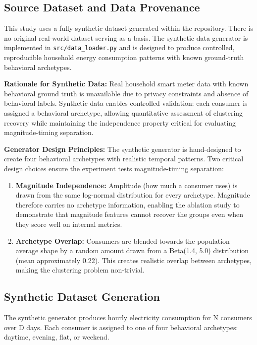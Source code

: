 \documentclass[11pt,a4paper]{article}
\begin{document}
\subsection{Source Dataset and Data Provenance}
\label{sec:provenance}

This study uses a fully synthetic dataset generated within the repository. There is no original real-world dataset serving as a basis. The synthetic data generator is implemented in \texttt{src/data\_loader.py} and is designed to produce controlled, reproducible household energy consumption patterns with known ground-truth behavioral archetypes.

\textbf{Rationale for Synthetic Data:} Real household smart meter data with known behavioral ground truth is unavailable due to privacy constraints and absence of behavioral labels. Synthetic data enables controlled validation: each consumer is assigned a behavioral archetype, allowing quantitative assessment of clustering recovery while maintaining the independence property critical for evaluating magnitude-timing separation.

\textbf{Generator Design Principles:} The synthetic generator is hand-designed to create four behavioral archetypes with realistic temporal patterns. Two critical design choices ensure the experiment tests magnitude-timing separation:

\begin{enumerate}
    \item \textbf{Magnitude Independence:} Amplitude (how much a consumer uses) is drawn from the same log-normal distribution for every archetype. Magnitude therefore carries no archetype information, enabling the ablation study to demonstrate that magnitude features cannot recover the groups even when they score well on internal metrics.
    
    \item \textbf{Archetype Overlap:} Consumers are blended towards the population-average shape by a random amount drawn from a Beta(1.4, 5.0) distribution (mean approximately 0.22). This creates realistic overlap between archetypes, making the clustering problem non-trivial.
\end{enumerate}

\subsection{Synthetic Dataset Generation}
\label{sec:synthesis}

The synthetic generator produces hourly electricity consumption for N consumers over D days. Each consumer is assigned to one of four behavioral archetypes: daytime, evening, flat, or weekend.
\end{document}
